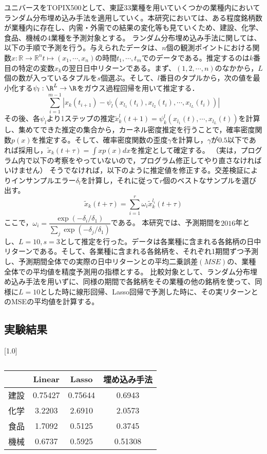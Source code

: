 \documentclass[JEL]{AEA}
\begin{document}
ユニバースをTOPIX500として、東証33業種を用いていくつかの業種内においてランダム分布埋め込み手法を適用していく。本研究においては、ある程度銘柄数が業種内に存在し、内需・外需での結果の変化等も見ていくため、建設、化学、食品、機械の4業種を予測対象とする。
ランダム分布埋め込み手法に関しては、以下の手順で予測を行う。与えられたデータは、$n$個の観測ポイントにおける関数$x:\mathbb{R}\to\mathbb{R}^{n} t\mapsto(x_{1},\cdots,x_{n})$の時間$t_{1},\cdots,t_{m}$でのデータである。推定するのは$k$番目の特定の変数$x_{k}$の翌日日中リターンである。まず、$(1,2,\cdots, n)$のなかから，$L$個の数が入っているタプルを$s$個選ぶ。そして、$l$番目のタプルから，次の値を最小化する$\psi_l:\R^L\to\R$をガウス過程回帰を用いて推定する．
\[
\sum_{i=1}^{m-1}|x_k(t_{i+1}) -\psi_l(x_{l_1}(t_i),x_{l_2}(t_i),\cdots,x_{l_L}(t_i))|
\]
その後、各$\psi_l$より1ステップの推定$\tilde{x}_k^l(t+1)=\psi_k^l(x_{l_1}(t),\cdots,x_{l_L}(t))$を計算し、集めてできた推定の集合から，カーネル密度推定を行うことで，確率密度関数$p(x)$を推定する。そして、確率密度関数の歪度$\gamma$を計算し，$\gamma$が$0.5$以下であれば採用し，$\tilde{x}_k(t+\tau)=\int xp(x)dx$を推定として確定する。
（実は，プログラム内で以下の考察をやっていないので，プログラム修正してやり直さなければいけません）
そうでなければ，以下のように推定値を修正する。交差検証によりインサンプルエラー$\delta_l$を計算し，それに従って$r$個のベストなサンプルを選び出す。
       \[
	\tilde{x}_k(t+\tau)=\sum_{i=1}^r\omega_i\tilde{x}_{k}^{l_i}(t+\tau)
       \]
ここで，$\omega_{i}=\dfrac{\exp(-\delta_i/\delta_1)}{\sum_j\exp(-\delta_j/\delta_1)}$である。
本研究では、予測期間を$2016$年とし、$L=10,s=3$として推定を行った。データは各業種に含まれる各銘柄の日中リターンである。そして、各業種に含まれる各銘柄を、それぞれ1期間ずつ予測し、予測期間全体での実際の日中リターンとの平均二乗誤差$(MSE)$の、業種全体での平均値を精度予測用の指標とする。
比較対象として、ランダム分布埋め込み手法を用いずに、同様の期間で各銘柄をその業種の他の銘柄を使って、同様に$L=10$とした時に線形回帰、Lasso回帰で予測した時に、その実リターンとのMSEの平均値を計算する。


\subsection{実験結果}

\begin{table}[h]
\begin{center}
\scalebox{0.6}[1.0]{
\begin{tabular}{|c|c|c|c|} \hline
 & Linear & Lasso & 埋め込み手法 \\\hline
建設 & 0.75427 & 0.75644 & 0.6943 \\\hline
化学 & 3.2203 & 2.6910 & 2.0573 \\\hline
食品 & 1.7092 & 0.5125 & 0.3745 \\\hline
機械 & 0.6737 & 0.5925 & 0.51308 \\\hline
\end{tabular}}
\end{center}
\caption{}
\label{}
\end{table}
\end{document}
